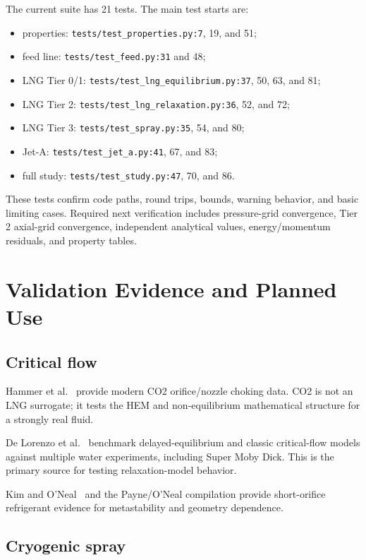 \documentclass[11pt]{article}
\newcommand{\srcline}[2]{\nolinkurl{#1:#2}}
\begin{document}
The current suite has 21 tests. The main test starts are:

\begin{itemize}
  \item properties: \srcline{tests/test_properties.py}{7}, 19, and 51;
  \item feed line: \srcline{tests/test_feed.py}{31} and 48;
  \item LNG Tier 0/1: \srcline{tests/test_lng_equilibrium.py}{37}, 50, 63, and 81;
  \item LNG Tier 2: \srcline{tests/test_lng_relaxation.py}{36}, 52, and 72;
  \item LNG Tier 3: \srcline{tests/test_spray.py}{35}, 54, and 80;
  \item Jet-A: \srcline{tests/test_jet_a.py}{41}, 67, and 83;
  \item full study: \srcline{tests/test_study.py}{47}, 70, and 86.
\end{itemize}

These tests confirm code paths, round trips, bounds, warning behavior, and basic limiting
cases. Required next verification includes pressure-grid convergence, Tier 2 axial-grid
convergence, independent analytical values, energy/momentum residuals, and property tables.

\section{Validation Evidence and Planned Use}

\subsection{Critical flow}

Hammer et al.~\cite{hammer2022} provide modern CO2 orifice/nozzle choking data.
CO2 is not an LNG surrogate; it tests the HEM and non-equilibrium mathematical
structure for a strongly real fluid.

De Lorenzo et al.~\cite{delorenzo2017} benchmark delayed-equilibrium and classic
critical-flow models against multiple water experiments, including Super Moby Dick.
This is the primary source for testing relaxation-model behavior.

Kim and O'Neal~\cite{kimoneal1995} and the Payne/O'Neal compilation provide
short-orifice refrigerant evidence for metastability and geometry dependence.

\subsection{Cryogenic spray}
\end{document}
